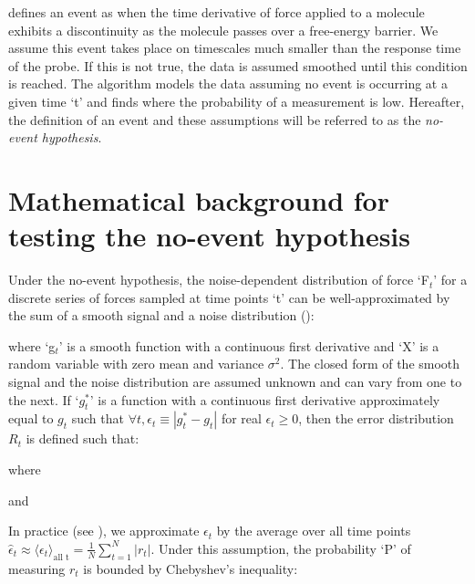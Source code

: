 \name{} defines an event as when the time derivative of force applied to a molecule exhibits a discontinuity as the molecule passes over a free-energy barrier. We assume this event takes place on timescales much smaller than the response time of the probe. If this is not true, the data is assumed smoothed until this condition is reached. The algorithm models the data assuming no event is occurring at a given time `t' and finds where the probability of a measurement is low. Hereafter, the definition of an event and these assumptions will be referred to as the \emph{no-event hypothesis}. 

\section{Mathematical background for testing the no-event hypothesis}

Under the no-event hypothesis, the noise-dependent distribution of force `F$_t$' for a discrete series of forces sampled at time points `t' can be well-approximated by the sum of a smooth signal and a noise distribution ():


where `g$_t$' is a smooth function with a continuous first derivative and `X' is a random variable with zero mean and variance $\sigma^2$. The closed form of the smooth signal and the noise distribution are assumed unknown and can vary from one \fec{} to the next. If `$g^{*}_t$' is a function with a continuous first derivative approximately equal to $g_t$ such that $\forall t,\epsilon_t\equiv|g^{*}_t-g_t|$ for real $\epsilon_t\ge 0$, then the error distribution $R_t$ is defined such that: 


where


and 


In practice (see ), we approximate $\epsilon_t$ by the average over all time points $\hat{\epsilon}_t \approx \langle \epsilon_t \rangle_{\text{all t}} = \frac{1}{N} \sum_{t=1}^N |r_t|$. Under this assumption, the probability `P' of measuring $r_t$ is bounded by Chebyshev's inequality:

